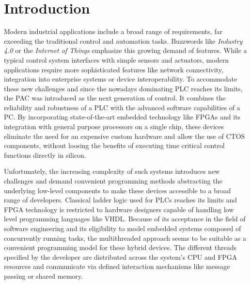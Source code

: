 \chapter{Introduction}

Modern industrial applications include a broad range of requirements, far
exceeding the traditional control and automation tasks. Buzzwords like
\emph{Industry 4.0} or the \emph{Internet of Things} emphasize this growing
demand of features. While a typical control system interfaces with simple
sensors and actuators, modern applications require more sophisticated features
like network connectivity, integration into enterprise systems or device
interoperability. To accommodate these new challenges and since the nowadays
dominating \ac{PLC} reaches its limits, the \ac{PAC} was introduced as the
next generation of control. It combines the reliability and robustness of a
\ac{PLC} with the advanced software capabilities of a PC. By incorporating
state-of-the-art embedded technology like \acp{FPGA} and its integration with
general purpose processors on a single chip, these devices eliminate the need
for an expensive custom hardware and allow  the use of \ac{CTOS} components,
without loosing the benefits of executing time critical control functions
directly in silicon.

Unfortunately, the increasing complexity of such systems introduces new
challenges and demand convenient programming methods abstracting the
underlying low-level components to make these devices accessible to a broad
range of developers. Classical ladder logic used for \acp{PLC} reaches its
limits and \ac{FPGA} technology is restricted to hardware designers capable of
handling low level programming languages like VHDL. Because of its acceptance
in the field of software engineering and its eligibility to model embedded
systems composed of concurrently running tasks, the multithreaded approach
seems to be suitable as a convenient programming model for these hybrid
devices. The different threads specified by the developer are distributed
across the system's \acs{CPU} and \ac{FPGA} resources and communicate via
defined interaction mechanisms like message passing or shared memory.

